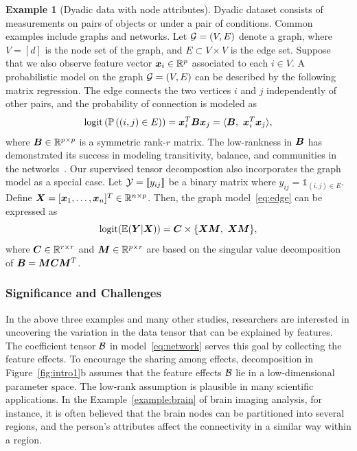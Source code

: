 \documentclass[10pt]{article}
\theoremstyle{definition}
\theoremstyle{definition}
\newtheorem{example}{Example}
\theoremstyle{definition}
\begin{document}
 \begin{example}[Dyadic data with node attributes] Dyadic dataset consists of measurements on pairs of objects or under a pair of conditions. Common examples include graphs and networks. Let $\mathcal{G}=(V,E)$ denote a graph, where $V=[d]$ is the node set of the graph, and $E\subset V\times V$ is the edge set. Suppose that we also observe feature vector $\bm x_i\in\mathbb{R}^p$ associated to each $i\in V$. A probabilistic model on the graph $\mathcal{G}=(V,E)$ can be described by the following matrix regression. The edge connects the two vertices $i$ and $j$ independently of other pairs, and the probability of connection is modeled as
\begin{equation}\label{eq:edge}
 \textup{logit}\left(\mathbb{P}\left((i,j)\in E\right)\right)=\mx^T_i\mB\mx_j=\langle \mB,\ \mx^T_i\mx_j\rangle,
 \end{equation}
 where $\bm B\in\mathbb{R}^{p\times p}$ is a symmetric rank-$r$ matrix. The low-rankness in $\bm B$ has demonstrated its success in modeling transitivity, balance, and communities in the networks~\cite{hoff2005bilinear}. Our supervised tensor decompostion also incorporates the graph model as a special case. Let $\mathcal{Y}=\llbracket y_{ij} \rrbracket$ be a binary matrix where $y_{ij}=\mathds{1}_{(i,j)\in E}$. Define $\bm X=[\bm x_1,\ldots,\bm x_n]^T\in\mathbb{R}^{n\times p}$. Then, the graph model~\eqref{eq:edge} can be expressed as
 \[
 \textup{logit}(\mathbb{E}(\mY|\mX))=\mC\times\{\mX\mM,\ \mX\mM\}, 
  \]
  where $\bm C\in\mathbb{R}^{r\times r}$ and $\bm M\in\mathbb{R}^{p\times r}$ are based on the singular value decomposition of $\bm B=\bm M\bm C\bm M^T$. 
  \end{example}
  

\subsubsection{Significance and Challenges}
In the above three examples and many other studies, researchers are interested in uncovering the variation in the data tensor that can be explained by features. The coefficient tensor $\mathcal{B}$ in model~\eqref{eq:network} serves this goal by collecting the feature effects. To encourage the sharing among effects, decomposition in Figure~\ref{fig:intro1}b assumes that the feature effects $\mathcal{B}$ lie in a low-dimensional parameter space. The low-rank assumption is plausible in many scientific applications. In the Example~\ref{example:brain} of brain imaging analysis, for instance, it is often believed that the brain nodes can be partitioned into several regions, and the person's attributes affect the connectivity in a similar way within a region. 
\end{document}
